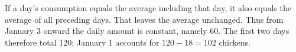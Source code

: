 If a day's consumption equals the average including that day, it also equals the average of all preceding days. That leaves the average unchanged. Thus from January 3 onward the daily amount is constant, namely 60. The first two days therefore total 120; January 1 accounts for $120-18=\boxed{102}$ chickens.
